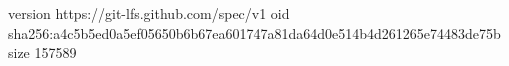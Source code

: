 version https://git-lfs.github.com/spec/v1
oid sha256:a4c5b5ed0a5ef05650b6b67ea601747a81da64d0e514b4d261265e74483de75b
size 157589

